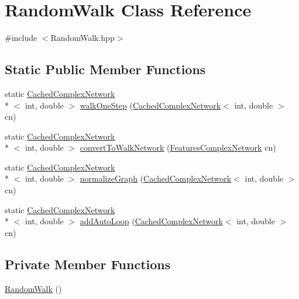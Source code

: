 \hypertarget{class_random_walk}{\section{Random\+Walk Class Reference}
\label{class_random_walk}
}


{\ttfamily \#include $<$Random\+Walk.\+hpp$>$}

\subsection*{Static Public Member Functions}
\begin{DoxyCompactItemize}
\item 
static \hyperlink{class_cached_complex_network}{Cached\+Complex\+Network}\\*
$<$ int, double $>$ \hyperlink{class_random_walk_a17eddb07d64f4ad98649605be957dde9}{walk\+One\+Step} (\hyperlink{class_cached_complex_network}{Cached\+Complex\+Network}$<$ int, double $>$ cn)
\item 
static \hyperlink{class_cached_complex_network}{Cached\+Complex\+Network}\\*
$<$ int, double $>$ \hyperlink{class_random_walk_a1977261ae7d29ca259c8f32109865ece}{convert\+To\+Walk\+Network} (\hyperlink{class_features_complex_network}{Features\+Complex\+Network} cn)
\item 
static \hyperlink{class_cached_complex_network}{Cached\+Complex\+Network}\\*
$<$ int, double $>$ \hyperlink{class_random_walk_a109a954297bccef967459d6dc1e9d98a}{normalize\+Graph} (\hyperlink{class_cached_complex_network}{Cached\+Complex\+Network}$<$ int, double $>$ cn)
\item 
static \hyperlink{class_cached_complex_network}{Cached\+Complex\+Network}\\*
$<$ int, double $>$ \hyperlink{class_random_walk_a135ac9a96a3d7d21f9c3e75298974752}{add\+Auto\+Loop} (\hyperlink{class_cached_complex_network}{Cached\+Complex\+Network}$<$ int, double $>$ cn)
\end{DoxyCompactItemize}
\subsection*{Private Member Functions}
\begin{DoxyCompactItemize}
\item 
\hyperlink{class_random_walk_a5ce75810b5bf17927f1e4aa48a4f1fd8}{Random\+Walk} ()
\end{DoxyCompactItemize}


